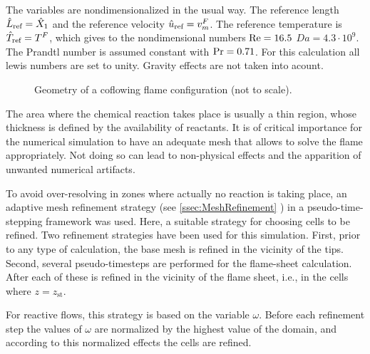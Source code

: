 The variables are nondimensionalized in the usual way. The reference length $\hat L_{\text{ref}} = \hat{X}_1$ and the reference velocity $\hat u_{\text{ref}} =v^F_m$. The reference temperature is $\hat T_{\text{ref}} = T^F$, which gives to the nondimensional numbers $\text{Re} = 16.5$ $Da = 4.3\cdot 10^9$. The Prandtl number is assumed constant with $\text{Pr} = 0.71$. For this calculation all lewis numbers are set to unity. Gravity effects are not taken into acount.
\begin{figure}[t]
	\centering
	\def\svgwidth{0.43\textwidth}
	\qquad\quad
	\def\svgwidth{0.35\textwidth}
	
	\caption{Geometry of a coflowing flame configuration (not to scale).} \label{fig:CoFlowGeometry}
\end{figure}
The area where the chemical reaction takes place is usually a thin region, whose thickness is defined by the availability of reactants. It is of critical importance for the numerical simulation to have an adequate mesh that allows to solve the flame appropriately. Not doing so can lead to non-physical effects and the apparition of unwanted numerical artifacts. 

To avoid over-resolving in zones where actually no reaction is taking place, an adaptive mesh refinement strategy (see \cref{ssec:MeshRefinement} ) in a pseudo-time-stepping framework was used.  Here, a suitable strategy for choosing cells to be refined. Two refinement strategies have been used for this simulation. First, prior to any type of calculation, the base mesh is refined in the vicinity of the tips.  Second, several pseudo-timesteps are performed for the flame-sheet calculation. After each of these is refined in the vicinity of the flame sheet, i.e., in the cells where $z = z_{\text{st}}$. 
 


For reactive flows, this strategy is based on the variable $\omega$.
Before each refinement step the values of $\omega$ are normalized by the highest value of the domain, and according to this normalized effects the cells are refined. %


